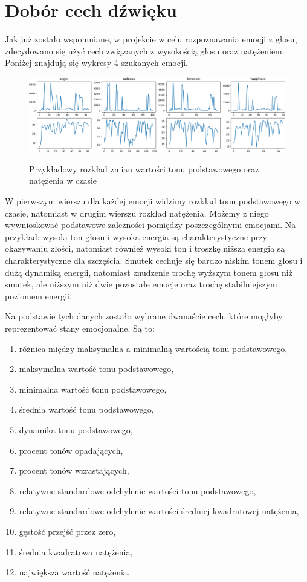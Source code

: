 \documentclass[declaration,shortabstract]{iithesis}
\begin{document}
\section{Dobór cech dźwięku}
Jak już zostało wspomniane, w projekcie w celu rozpoznawania emocji z głosu, zdecydowano się użyć cech związanych z wysokością głosu oraz natężeniem. Poniżej znajdują się wykresy 4 szukanych emocji.

\begin{figure}[!ht]
\caption{Przykładowy rozkład zmian wartości tonu podstawowego oraz natężenia w czasie}
\hspace*{-2cm}  
	\includegraphics[scale=0.3]{b01.png}
\label{wyk_emo}
\end{figure}
	
W pierwszym wierszu dla każdej emocji widzimy rozkład tonu podstawowego w czasie, natomiast w drugim wierszu rozkład natężenia. Możemy z niego wywnioskować podstawowe zależności pomiędzy poszczególnymi emocjami. Na przykład: wysoki ton głosu i wysoka energia są charakterystyczne  przy okazywaniu złości, natomiast również wysoki ton i troszkę niższa energia są charakterystyczne dla szczęścia. Smutek cechuje się bardzo niskim tonem głosu i dużą dynamiką energii, natomiast znudzenie trochę wyższym tonem głosu niż smutek, ale niższym niż dwie pozostałe emocje oraz trochę stabilniejszym poziomem energii. 

Na podstawie tych danych zostało wybrane dwanaście cech, które mogłyby reprezentować stany emocjonalne.
Są to: 
\begin{enumerate}
\item różnica między maksymalna a minimalną wartością tonu podstawowego,
\item maksymalna wartość tonu podstawowego,
\item minimalna wartość tonu podstawowego,
\item średnia wartość tonu podstawowego,
\item dynamika tonu podstawowego,
\item procent tonów opadających,
\item procent tonów wzrastających,
\item relatywne standardowe odchylenie wartości tonu podstawowego,
\item relatywne standardowe odchylenie wartości średniej kwadratowej natężenia,
\item gęstość przejść przez zero,
\item średnia kwadratowa natężenia,
\item największa wartość natężenia.
\end{enumerate}
\end{document}

